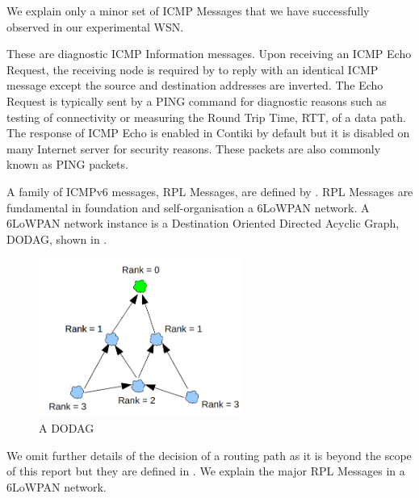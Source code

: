 We explain only a minor set of ICMP Messages that we have successfully observed in our experimental WSN.
\begin{description}[style=nextline]
	\item[\textbf{Echo Request and Reply Messages}]
	These are diagnostic ICMP Information messages. Upon receiving an ICMP Echo Request, the receiving node is required by \cite{rfc4443} to reply with an identical ICMP message except the source and destination addresses are inverted. The Echo Request is typically sent by a PING command for diagnostic reasons such as testing of connectivity or measuring the Round Trip Time, RTT, of a data path. The response of ICMP Echo is enabled in Contiki by default but it is disabled on many Internet server for security reasons. These packets are also commonly known as PING packets.
	
	\item[\textbf{RPL Messages}]
	A family of ICMPv6 messages, RPL Messages, are defined by \cite{rfc6550}. RPL Messages are fundamental in foundation and self-organisation a 6LoWPAN network. A 6LoWPAN network instance is a Destination Oriented Directed Acyclic Graph, DODAG, shown in . 

	\begin{figure}[th!]
		\center
		\includegraphics[width=0.6\textwidth]{fig/dodag.png}
		\caption{A DODAG}
		\label{Fig: DODAG}
	\end{figure}
	
	We omit further details of the decision of a routing path as it is beyond the scope of this report but they are defined in \cite{rfc6550}. We explain the major RPL Messages in a 6LoWPAN network.
	

\end{description}
